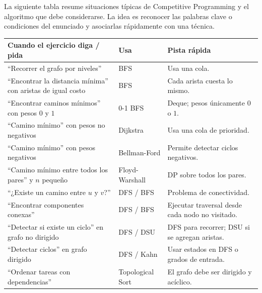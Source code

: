\documentclass[10pt,a4paper,twocolumn]{article}
\begin{document}
La siguiente tabla resume situaciones típicas de Competitive Programming
y el algoritmo que debe considerarse. La idea es reconocer las palabras
clave o condiciones del enunciado y asociarlas rápidamente con una técnica.

\begin{table}[H]
\raggedright
\scriptsize
\setlength{\tabcolsep}{2.5pt}
\renewcommand{\arraystretch}{1.15}
\begin{tabular}{|p{}|p{}|p{}|}
\hline
\textbf{Cuando el ejercicio diga / pida} &
\textbf{Usa} &
\textbf{Pista rápida} \\
\hline

``Recorrer el grafo por niveles'' &
BFS &
Usa una cola. \\
\hline

``Encontrar la distancia mínima'' con aristas de igual costo &
BFS &
Cada arista cuesta lo mismo. \\
\hline

``Encontrar caminos mínimos'' con pesos $0$ y $1$ &
0-1 BFS &
Deque; pesos únicamente $0$ o $1$. \\
\hline

``Camino mínimo'' con pesos no negativos &
Dijkstra &
Usa una cola de prioridad. \\
\hline

``Camino mínimo'' con pesos negativos &
Bellman-Ford &
Permite detectar ciclos negativos. \\
\hline

``Camino mínimo entre todos los pares'' y $n$ pequeño &
Floyd-Warshall &
DP sobre todos los pares. \\
\hline

``¿Existe un camino entre $u$ y $v$?'' &
DFS / BFS &
Problema de conectividad. \\
\hline

``Encontrar componentes conexas'' &
DFS / BFS &
Ejecutar traversal desde cada nodo no visitado. \\
\hline

``Detectar si existe un ciclo'' en grafo no dirigido &
DFS / DSU &
DFS para recorrer; DSU si se agregan aristas. \\
\hline

``Detectar ciclos'' en grafo dirigido &
DFS / Kahn &
Usar estados en DFS o grados de entrada. \\
\hline

``Ordenar tareas con dependencias'' &
Topological Sort &
El grafo debe ser dirigido y acíclico. \\
\hline


\end{tabular}
\end{table}
\end{document}
